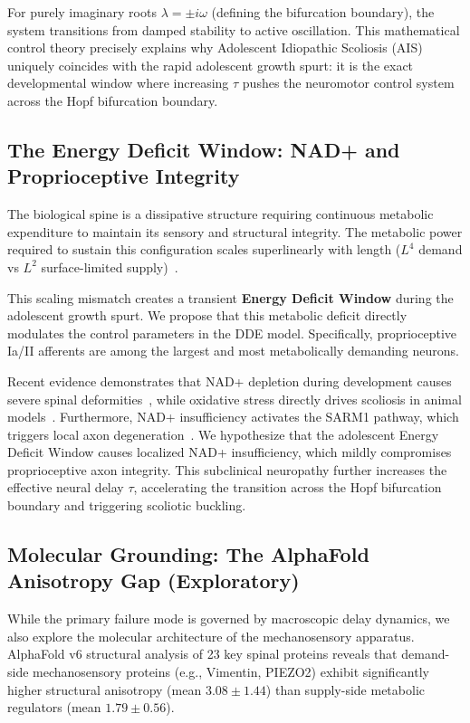 For purely imaginary roots $\lambda = \pm i\omega$ (defining the bifurcation boundary), the system transitions from damped stability to active oscillation. This mathematical control theory precisely explains why Adolescent Idiopathic Scoliosis (AIS) uniquely coincides with the rapid adolescent growth spurt: it is the exact developmental window where increasing $\tau$ pushes the neuromotor control system across the Hopf bifurcation boundary.

\subsection{The Energy Deficit Window: NAD+ and Proprioceptive Integrity}

The biological spine is a dissipative structure requiring continuous metabolic expenditure to maintain its sensory and structural integrity. The metabolic power required to sustain this configuration scales superlinearly with length ($L^4$ demand vs $L^2$ surface-limited supply)~\cite{sato2025convective}.

This scaling mismatch creates a transient \textbf{Energy Deficit Window} during the adolescent growth spurt. We propose that this metabolic deficit directly modulates the control parameters in the DDE model. Specifically, proprioceptive Ia/II afferents are among the largest and most metabolically demanding neurons.

Recent evidence demonstrates that NAD+ depletion during development causes severe spinal deformities~\cite{basse2021nampt}, while oxidative stress directly drives scoliosis in animal models~\cite{pumputis2025oxidative}. Furthermore, NAD+ insufficiency activates the SARM1 pathway, which triggers local axon degeneration~\cite{gerdts2015sarm1}. We hypothesize that the adolescent Energy Deficit Window causes localized NAD+ insufficiency, which mildly compromises proprioceptive axon integrity. This subclinical neuropathy further increases the effective neural delay $\tau$, accelerating the transition across the Hopf bifurcation boundary and triggering scoliotic buckling.

\subsection{Molecular Grounding: The AlphaFold Anisotropy Gap (Exploratory)}

While the primary failure mode is governed by macroscopic delay dynamics, we also explore the molecular architecture of the mechanosensory apparatus. AlphaFold v6 structural analysis of 23 key spinal proteins reveals that demand-side mechanosensory proteins (e.g., Vimentin, PIEZO2) exhibit significantly higher structural anisotropy (mean $3.08 \pm 1.44$) than supply-side metabolic regulators (mean $1.79 \pm 0.56$).

